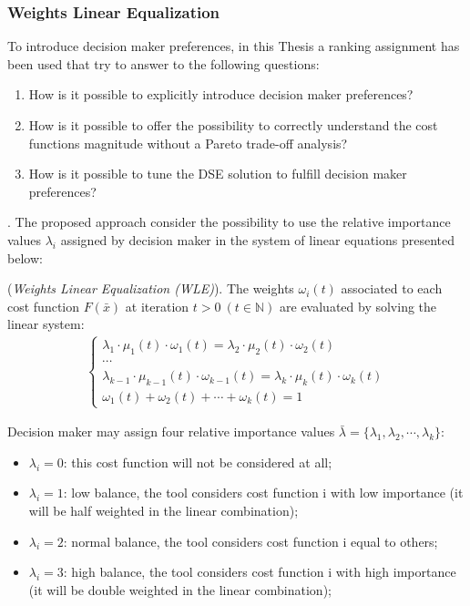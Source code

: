 \subsubsection{Weights Linear Equalization}\label{WLE_def}
%
To introduce decision maker preferences, in this Thesis a ranking assignment has been used that try to answer to the following questions:
%
\begin{enumerate}
    \item How is it possible to explicitly introduce decision maker preferences?
    \item How is it possible to offer the possibility to correctly understand the cost functions magnitude without a Pareto trade-off analysis?
    \item How is it possible to tune the DSE solution to fulfill decision maker preferences?
\end{enumerate}.
%
The proposed approach consider the possibility to use the relative importance values $\lambda_i$ assigned by decision maker in the system of linear equations presented below:
\begin{definition}{(\textit{Weights Linear Equalization (WLE)}).}
%
The weights $\omega_i(t)$ associated to each cost function $F(\bar x)$ at iteration $t > 0 \ (t \in \mathbb{N})$ are evaluated by solving the linear system:
%
\begin{equation} \label{equationtt}
    \begin{aligned}
        \begin{cases} 
        \lambda_1 \cdot \mu_1(t) \cdot \omega_1(t) = \lambda_2 \cdot \mu_2(t) \cdot \omega_2(t) \\ 
        \cdots \\
        \lambda_{k-1} \cdot \mu_{k-1}(t) \cdot \omega_{k-1}(t) = \lambda_k \cdot \mu_k(t) \cdot \omega_k(t) \\
        \omega_1(t) + \omega_2(t) + \cdots + \omega_k(t) = 1
        \end{cases}
\end{aligned}
\end{equation}
%
\end{definition}
%
Decision maker may assign four relative importance values $\bar \lambda = \{ \lambda_1,\lambda_2, \cdots , \lambda_k \}$: 
%
\begin{itemize}
    \item $\lambda_i = 0$: this cost function will not be considered at all; 
    \item $\lambda_i = 1$: low balance, the tool considers cost function i with low importance (it will be half weighted in the linear combination); 
    \item $\lambda_i = 2$: normal balance, the tool considers cost function i equal to others; 
    \item $\lambda_i = 3$: high balance, the tool considers cost function i with high importance (it will be double weighted in the linear combination);
\end{itemize}
